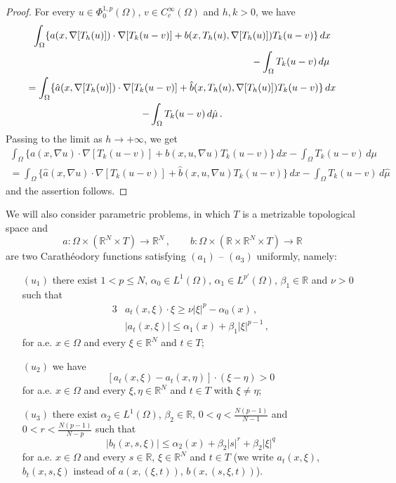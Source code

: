 \documentclass[twoside,reqno]{amsart}
\numberwithin{equation}{section}
\theoremstyle{definition}
\newcommand{\R}{\mathbb{R}}
\begin{document}
%
\begin{proof}
For every $u\in \Phi^{1,p}_0(\Omega)$,
$v\in C^\infty_c(\Omega)$ and $h,k>0$, we have
\begin{multline*}
\int_{\Omega} \{a(x,\nabla[T_h(u)])\cdot\nabla [T_k(u-v)] 
+ b(x,T_h(u),\nabla [T_h(u)])T_k(u-v)\}\,dx \\
\null\qquad\qquad\qquad\qquad\qquad\qquad
\qquad\qquad\qquad\qquad\qquad
- \int_\Omega T_k(u-v)\,d\mu \\
= \int_{\Omega} \{\hat{a}(x,\nabla[T_h(u)])\cdot\nabla [T_k(u-v)] 
+ \hat{b}(x,T_h(u),\nabla[T_h(u)])T_k(u-v)\}\,dx \\ 
- \int_\Omega T_k(u-v)\,d\hat{\mu}  \,.
\end{multline*}
Passing to the limit as $h\to+\infty$, we get
\begin{multline*}
\int_{\Omega} \{a(x,\nabla u)\cdot\nabla [T_k(u-v)] 
+ b(x,u,\nabla u)T_k(u-v)\}\,dx 
- \int_\Omega T_k(u-v)\,d\mu \\
= \int_{\Omega} \{\hat{a}(x,\nabla u)\cdot\nabla [T_k(u-v)] 
+ \hat{b}(x,u,\nabla u)T_k(u-v)\}\,dx 
- \int_\Omega T_k(u-v)\,d\hat{\mu}  
\end{multline*}
and the assertion follows.
\end{proof}
%
We will also consider parametric problems, 
in which $T$ is a metrizable topological space and
\[
a:\Omega\times(\R^N\times T)\rightarrow \R^N\,,\qquad
b:\Omega\times(\R\times\R^N\times T)\rightarrow \R
\]
are two Carath\'eodory functions satisfying $(a_1)$ -- $(a_3)$
uniformly, namely:
\begin{itemize}
\item[$(u_1)$]
there exist $1<p\leq N$, $\alpha_0\in L^1(\Omega)$, 
$\alpha_1\in L^{p'}(\Omega)$, $\beta_1\in\R$ and $\nu>0$
such that
\begin{alignat*}{3}
&a_t(x,\xi)\cdot\xi \geq \nu |\xi|^p - \alpha_0(x)\,,\\
&|a_t(x,\xi)| \leq \alpha_1(x) + \beta_1|\xi|^{p-1} \,,
\end{alignat*}
for a.e. $x\in\Omega$ and every $\xi\in\R^N$ and $t\in T$;
\item[$(u_2)$]
we have
\[
[a_t(x,\xi)-a_t(x,\eta)]\cdot(\xi-\eta) >0
\]
for a.e. $x\in\Omega$ and every $\xi,\eta\in\R^N$ and
$t\in T$ with $\xi\neq\eta$;
\item[$(u_3)$]
there exist $\alpha_2\in L^1(\Omega)$, $\beta_2\in\R$,
$0<q<\frac{N(p-1)}{N-1}$ and $0<r<\frac{N(p-1)}{N-p}$
such that
\[
|b_t(x,s,\xi)|\leq \alpha_2(x) + \beta_2|s|^r +\beta_2|\xi|^q
\]
for a.e. $x\in \Omega$ and every $s\in\R$, $\xi\in\R^N$
and $t\in T$
(we write $a_t(x,\xi)$, $b_t(x,s,\xi)$ instead of 
$a(x,(\xi,t))$, $b(x,(s,\xi,t))$).
\end{itemize}
\end{document}
